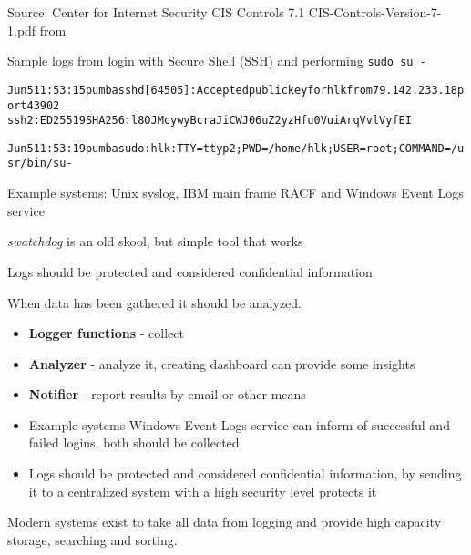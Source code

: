 \documentclass[Screen16to9,17pt]{foils}
\begin{document}
Source:
Center for Internet Security CIS Controls 7.1 CIS-Controls-Version-7-1.pdf
from 





Sample logs from login with Secure Shell (SSH) and performing \verb+sudo su -+
\begin{alltt}\footnotesize
Jun  5 11:53:15 pumba sshd[64505]: Accepted publickey for hlk from 79.142.233.18 port 43902
 ssh2: ED25519 SHA256:l8OJMcywyBcraJiCWJ06uZ2yzHfu0VuiArqVvlVyfEI

Jun  5 11:53:19 pumba sudo:      hlk : TTY=ttyp2 ; PWD=/home/hlk ; USER=root ; COMMAND=/usr/bin/su -
\end{alltt}

\begin{list1}
\item Example systems: Unix syslog, IBM main frame RACF and Windows Event Logs service
\item \emph{swatchdog} is an old skool, but simple tool that works
\item Logs should be protected and considered confidential information
\end{list1}




When data has been gathered it should be analyzed.

\begin{itemize}
\item {\bf Logger functions} - collect
\item {\bf Analyzer} - analyze it, creating dashboard can provide some insights
\item {\bf Notifier} - report results by email or other means
\item Example systems Windows Event Logs service can inform of successful and failed logins, both should be collected
\item Logs should be protected and considered confidential information, by sending it to a centralized system with a high security level protects it
\end{itemize}

Modern systems exist to take all data from logging and provide high capacity storage, searching and sorting.


\end{document}
